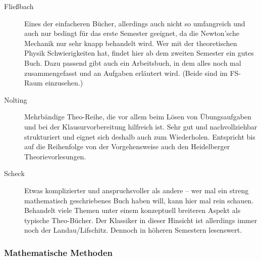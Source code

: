 \begin{description}



\item[Fließbach]{
Eines der einfacheren Bücher, allerdings auch nicht so umfangreich
und auch nur bedingt für das erste Semester geeignet, da die Newton'sche Mechanik nur sehr knapp behandelt wird. Wer mit
der theoretischen Physik Schwierigkeiten hat, findet hier ab dem zweiten Semester ein gutes
Buch. Dazu passend gibt auch ein
Arbeitsbuch, in dem alles noch mal zusammengefasst und an Aufgaben
erläutert wird.
(Beide sind im FS-Raum einzusehen.)}


\item[Nolting]{Mehrbändige Theo-Reihe, die vor allem beim Lösen von
Übungsaufgaben und bei der Klausurvorbereitung hilfreich ist. Sehr
gut und nachvollziehbar strukturiert und eignet sich deshalb auch
zum Wiederholen. Entspricht bis auf die Reihenfolge von der
Vorgehensweise auch den Heidelberger Theorievorlesungen.
}

\item[Scheck]{Etwas komplizierter und anspruchsvoller als andere
-- wer mal ein streng mathematisch geschriebenes Buch haben will,
kann hier mal rein schauen. Behandelt viele Themen unter einem
konzeptuell breiteren Aspekt als typische Theo-Bücher. Der
Klassiker in dieser Hinsicht ist allerdings immer noch der
Landau/Lifschitz. Dennoch in höheren Semestern lesenswert.}

\end{description}


\subsubsection{Mathematische Methoden}

